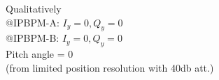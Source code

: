 \documentclass[a4paper,11pt]{book}
\begin{document}
\begin{minipage}{0.5\textwidth}
\end{minipage}\hfill\hspace*{-2cm}
\begin{minipage}{0.5\textwidth}
Qualitatively\\
@IPBPM-A: $I_y=0, Q_y=0$\\
@IPBPM-B: $I_y=0, Q_y=0$\\
Pitch angle = 0\\
(from limited position resolution with 40db att.)
\end{minipage}\\
\end{document}
